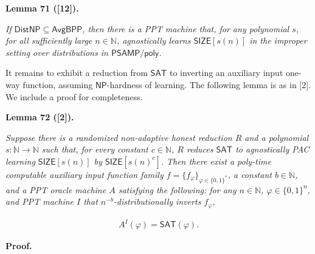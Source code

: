 \documentclass[10pt,a4paper]{article}
\begin{document}


\par\medskip\noindent\textbf{
\textbf{Lemma 71}\textbf{ }([12])\textbf{.}
}\par



\emph{If ${\mathsf{Dist}}{\mathsf{NP}}\subseteq{\mathsf{Avg}}{\mathsf{BPP}}$, then there is a PPT machine that, for any polynomial $s$, for all sufficiently large $n\in\mathbb{N}$, agnostically learns ${\mathsf{SIZE}}[s(n)]$ in the improper setting over distributions in ${\mathsf{P}}{\mathsf{SAMP}}/{\mathsf{poly}}$.}\par






It remains to exhibit a reduction from ${\mathsf{SAT}}$ to inverting an auxiliary input one-way function, assuming ${\mathsf{NP}}$-hardness of learning. The following lemma is as in [2]. We include a proof for completeness.\par





\par\medskip\noindent\textbf{
\textbf{Lemma 72}\textbf{ }([2])\textbf{.}
}\par



\emph{Suppose there is a randomized non-adaptive honest reduction $R$ and a polynomial $s:\mathbb{N}\to\mathbb{N}$ such that, for every constant $c\in\mathbb{N}$, $R$ reduces ${\mathsf{SAT}}$ to agnostically PAC learning ${\mathsf{SIZE}}[s(n)]$ by ${\mathsf{SIZE}}[s(n)^{c}]$. Then there exist a poly-time computable auxiliary input function family $f=\{f_{\varphi}\}_{\varphi\in\{0,1\}^{*}}$, a constant $b\in\mathbb{N}$, and a PPT oracle machine $A$ satisfying the following: for any $n\in\mathbb{N}$, $\varphi\in\{0,1\}^{n}$, and PPT machine $I$ that $n^{-b}$-distributionally inverts $f_{\varphi}$,}\par


\[\begin{gathered}
A^{I}(\varphi)={\mathsf{SAT}}(\varphi).
\end{gathered}\]







\par\medskip\noindent\textbf{Proof.}\par
\end{document}
